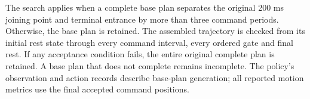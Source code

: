 \documentclass[preprint,12pt]{elsarticle}
\begin{document}
The search applies when a complete base plan separates the original 200 ms joining point and terminal entrance by more than three command periods. Otherwise, the base plan is retained. The assembled trajectory is checked from its initial rest state through every command interval, every ordered gate and final rest. If any acceptance condition fails, the entire original complete plan is retained. A base plan that does not complete remains incomplete. The policy's observation and action records describe base-plan generation; all reported motion metrics use the final accepted command positions.



\begingroup
\setlength{\bibsep}{3pt plus 0.3pt}


\endgroup
\end{document}
